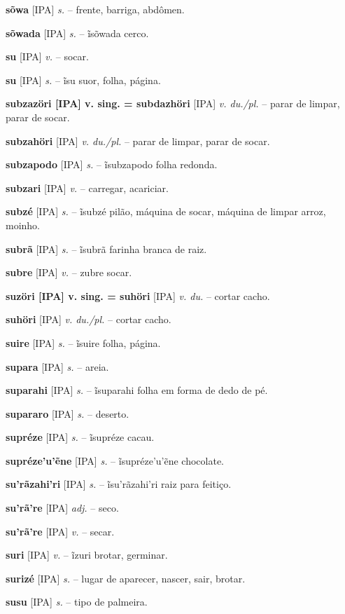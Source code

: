 \textbf{sõwa} [IPA] \textit{s.} -- frente, barriga, abdômen.

\textbf{sõwada} [IPA] \textit{s.} -- ĩsõwada cerco.

\textbf{su} [IPA] \textit{v.} -- socar.

\textbf{su} [IPA] \textit{s.} -- ĩsu suor, folha, página.

\textbf{subzazöri [IPA] v. sing. = subdazhöri} [IPA] \textit{v. du./pl.} -- parar de limpar, parar de socar.

\textbf{subzahöri} [IPA] \textit{v. du./pl.} -- parar de limpar, parar de socar.

\textbf{subzapodo} [IPA] \textit{s.} -- ĩsubzapodo folha redonda.

\textbf{subzari} [IPA] \textit{v.} -- carregar, acariciar.

\textbf{subzé} [IPA] \textit{s.} -- ĩsubzé pilão, máquina de socar, máquina de limpar arroz, moinho.

\textbf{subrã} [IPA] \textit{s.} -- ĩsubrã farinha branca de raiz.

\textbf{subre} [IPA] \textit{v.} -- zubre socar.

\textbf{suzöri [IPA] v. sing. = suhöri} [IPA] \textit{v. du.} -- cortar cacho.

\textbf{suhöri} [IPA] \textit{v. du./pl.} -- cortar cacho.

\textbf{suire} [IPA] \textit{s.} -- ĩsuire folha, página.

\textbf{supara} [IPA] \textit{s.} -- areia.

\textbf{suparahi} [IPA] \textit{s.} -- ĩsuparahi folha em forma de dedo de pé.

\textbf{supararo} [IPA] \textit{s.} -- deserto.

\textbf{supréze} [IPA] \textit{s.} -- ĩsupréze cacau.

\textbf{supréze'u'ẽne} [IPA] \textit{s.} -- ĩsupréze'u'ẽne chocolate.

\textbf{su'rãzahi'ri} [IPA] \textit{s.} -- ĩsu'rãzahi'ri raiz para feitiço.

\textbf{su'rã're} [IPA] \textit{adj.} -- seco.

\textbf{su'rã're} [IPA] \textit{v.} -- secar.

\textbf{suri} [IPA] \textit{v.} -- ĩzuri brotar, germinar.

\textbf{surizé} [IPA] \textit{s.} -- lugar de aparecer, nascer, sair, brotar.

\textbf{susu} [IPA] \textit{s.} -- tipo de palmeira.

